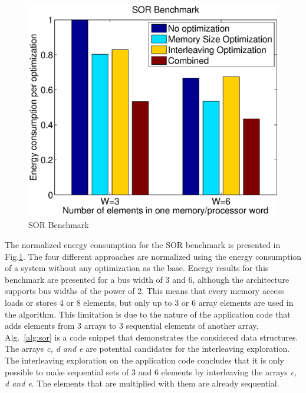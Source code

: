 \documentclass[prodmode,acmtecs]{acmsmall}
\begin{document}
\begin{figure}
\centering
	\includegraphics[scale = 0.5]{Images/sor.eps} 
	\caption{SOR Benchmark}
	\label{fig:sor}
\end{figure}

The normalized energy consumption for the SOR benchmark is presented in Fig.\ref{fig:sor}.
The four different approaches are normalized using the energy consumption of a system without any optimization as the base.
Energy results for this benchmark are presented for a bus width of 3 and 6, although the architecture supports bus widths of the power of 2.
This means that every memory access loads or stores 4 or 8 elements, but only up to 3 or 6 array elements are used in the algorithm.
This limitation is due to the nature of the application code that adds elements from 3 arrays to 3 sequential elements of another array. 
Alg.~\ref{alg:sor} is a code snippet that demonstrates the considered data structures.
The arrays \textit{c, d and e} are potential candidates for the interleaving exploration.
The interleaving exploration on the application code concludes that it is only possible to make sequential sets of 3 and 6 elements by interleaving the arrays \textit{c, d and e}.
The elements that are multiplied with them are already sequential.
\end{document}
